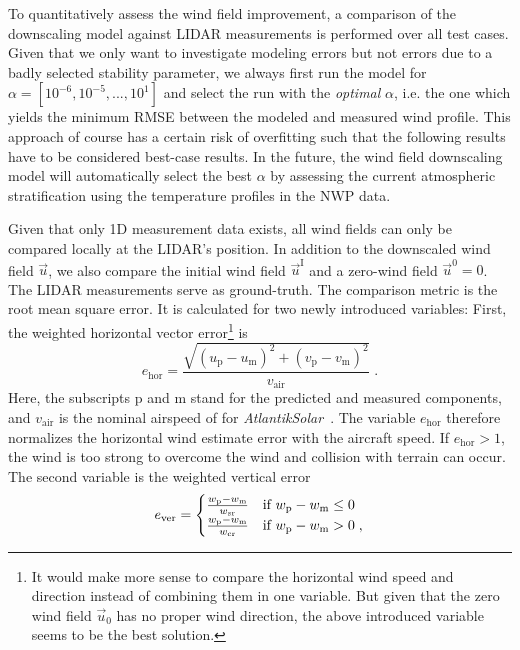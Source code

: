 \documentclass[twocolumn,letterpaper]{IEEEAerospaceCLS}
\begin{document}
To quantitatively assess the wind field improvement, a comparison of the downscaling model against LIDAR measurements is performed over all test cases. Given that we only want to investigate modeling errors but not errors due to a badly selected stability parameter, we always first run the model for $\alpha = [10^{-6},10^{-5},...,10^1]$ and select the run with the \emph{optimal} $\alpha$, i.e. the one which yields the minimum \ac{RMSE} between the modeled and measured wind profile. This approach of course has a certain risk of overfitting such that the following results have to be considered best-case results. In the future, the wind field downscaling model will automatically select the best $\alpha$ by assessing the current atmospheric stratification using the temperature profiles in the \ac{NWP} data.

Given that only 1D measurement data exists, all wind fields can only be compared locally at the LIDAR's position. In addition to the downscaled wind field $\vec{u}$, we also compare the initial wind field $\vec{u}^\text{I}$ and a zero-wind field $\vec{u}^0=0$. The LIDAR measurements serve as ground-truth. The comparison metric is the root mean square error. It is calculated for two newly introduced variables: First, the weighted horizontal vector error\footnote{It would make more sense to compare the horizontal wind speed and direction instead of combining them in one variable. But given that the zero wind field $\vec{u}_0$ has no proper wind direction, the above introduced variable seems to be the best solution.} is
	\begin{equation}
	e_\text{hor} = \frac{\sqrt{(u_\text{p} - u_\text{m})^2 + (v_\text{p} - v_\text{m})^2}}{v_\text{air}} \; . 
	\end{equation}
Here, the subscripts $\text{p}$ and $\text{m}$ stand for the predicted and measured components, and $v_\text{air}$ is the nominal airspeed of  for \emph{AtlantikSolar}~\cite{Oettershagen_JFR2017}. The variable $e_\text{hor}$ therefore normalizes the horizontal wind estimate error with the aircraft speed. If $e_\text{hor}>1$, the wind is too strong to overcome the wind and collision with terrain can occur. The second variable is the weighted vertical error
	\begin{align}
	e_\text{ver} = \begin{cases} \frac{w_\text{p} - w_\text{m}}{w_\text{sr}} & \textnormal{if } w_\text{p} - w_\text{m} \leq 0 \\ \frac{w_\text{p} - w_\text{m}}{w_\text{cr}} & \textnormal{if } w_\text{p} - w_\text{m} > 0 \; , \end{cases}
	\end{align}
\end{document}
